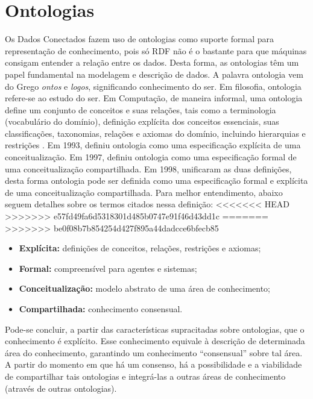 \section{Ontologias}
Os Dados Conectados fazem uso de ontologias como suporte formal para representação de conhecimento, pois só RDF não é o bastante para que máquinas consigam entender a relação entre os dados. Desta forma, as ontologias têm um papel fundamental na modelagem e descrição de dados. A palavra ontologia vem do Grego \textit{ontos} e \textit{logos}, significando conhecimento do ser. Em filosofia, ontologia refere-se ao estudo do ser. Em Computação, de maneira informal, uma ontologia define um conjunto de conceitos e suas relações, tais como a terminologia (vocabulário do domínio), definição explícita dos conceitos essenciais, suas classificações, taxonomias, relações e axiomas do domínio, incluindo hierarquias e restrições \cite{deved2006semantic}. Em 1993, \citeauthor{gruber1993translation} definiu ontologia como uma especificação explícita de uma conceitualização. Em 1997, \citeauthor{borstw1997construction} definiu ontologia como uma especificação formal de uma conceitualização compartilhada. Em 1998, \citeauthor{studer1998knowledge} unificaram as duas definições, desta forma ontologia pode ser definida como uma especificação formal e explícita de uma conceitualização compartilhada. Para melhor entendimento, abaixo seguem detalhes sobre os termos citados nessa definição: 
% 
% 
<<<<<<< HEAD
>>>>>>> e57fd49fa6d5318301d485b0747e91f46d43dd1c
=======
%
%
>>>>>>> be0f08b7b854254d427f895a44dadcce6bfecb85
\begin{itemize}
	\item \textbf{Explícita:} definições de conceitos, relações, restrições e axiomas; 
	\item \textbf{Formal:} compreensível para agentes e sistemas; 
	\item \textbf{Conceitualização:} modelo abstrato de uma área de conhecimento; 
	\item \textbf{Compartilhada:} conhecimento consensual. 
\end{itemize}
Pode-se concluir, a partir das características supracitadas sobre ontologias, que o conhecimento é explícito. Esse conhecimento equivale à descrição de determinada área do conhecimento, garantindo um conhecimento “consensual” sobre tal área. A partir do momento em que há um consenso, há a possibilidade e a viabilidade de compartilhar tais ontologias e integrá-las a outras áreas de conhecimento (através de outras ontologias).

